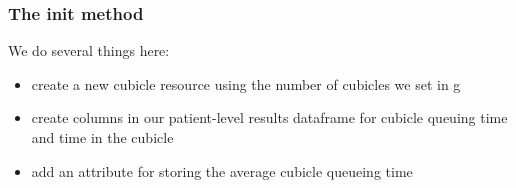\documentclass[
  letterpaper,
  DIV=11,
  numbers=noendperiod]{scrreprt}
\providecommand{\tightlist}{%
  \setlength{\itemsep}{0pt}\setlength{\parskip}{0pt}}\usepackage{longtable,booktabs,array}
\begin{document}
\subsubsection{\texorpdfstring{The \textbf{init}
method}{The init method}}\label{the-init-method-10}

We do several things here:

\begin{itemize}
\tightlist
\item
  create a new cubicle resource using the number of cubicles we set in g
\item
  create columns in our patient-level results dataframe for cubicle
  queuing time and time in the cubicle
\item
  add an attribute for storing the average cubicle queueing time
\end{itemize}
\end{document}
